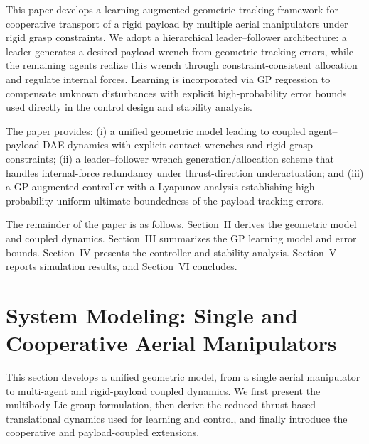 \documentclass[letterpaper, 10 pt, conference]{ieeeconf}  %
\newcommand{\0}{\matr{0}}
\begin{document}
This paper develops a learning-augmented geometric tracking framework for
cooperative transport of a rigid payload by multiple aerial manipulators under
rigid grasp constraints.
We adopt a hierarchical leader--follower architecture: a leader generates a
desired payload wrench from geometric tracking errors, while the remaining
agents realize this wrench through constraint-consistent allocation and regulate
internal forces.
Learning is incorporated via GP regression to compensate unknown disturbances
with explicit high-probability error bounds used directly in the control design
and stability analysis.

The paper provides: (i) a unified geometric model leading
to coupled agent--payload DAE dynamics with explicit contact wrenches and rigid
grasp constraints; (ii) a leader--follower wrench generation/allocation scheme
that handles internal-force redundancy under thrust-direction underactuation;
and (iii) a GP-augmented controller with a Lyapunov analysis establishing
high-probability uniform ultimate boundedness of the payload tracking errors.

The remainder of the paper is as follows. Section~II derives the geometric model and coupled
dynamics. Section~III summarizes the GP learning model and error bounds.
Section~IV presents the controller and stability analysis. Section~V reports
simulation results, and Section~VI concludes.




\section{System Modeling: Single and Cooperative Aerial Manipulators}
\label{sec:ps}

This section develops a unified geometric model, from a single aerial manipulator to multi-agent and rigid-payload coupled dynamics. We first present the multibody Lie-group formulation, then derive the reduced thrust-based translational dynamics used for learning and control, and finally introduce the cooperative and payload-coupled extensions.
\end{document}
